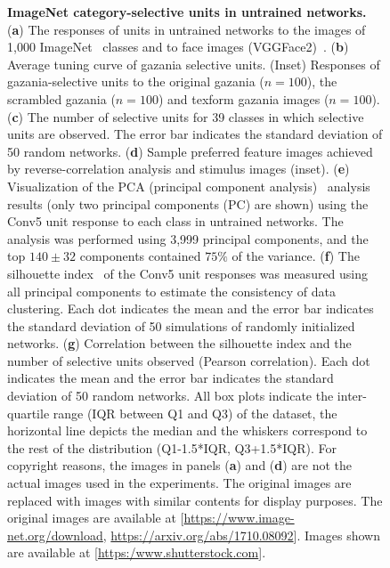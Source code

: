 \documentclass[sn-mathphys]{sn-jnl}%
\theoremstyle{thmstyleone}%
\theoremstyle{thmstyletwo}%
\theoremstyle{thmstylethree}%
\begin{document}
\begin{figure}[htbp]
	\centering
	\caption{
		\textbf{ImageNet category-selective units in untrained networks.
		}
		(\textbf{a}) The responses of units in untrained networks to the images of 1,000 ImageNet~\cite{ILSVRC15} classes and to face images (VGGFace2)~\cite{cao2018vggface2}.
		(\textbf{b}) Average tuning curve of gazania selective units.
		(Inset) Responses of gazania-selective units to the original gazania ($ n = 100 $), the scrambled gazania ($ n = 100 $) and texform gazania images ($ n = 100 $).
		(\textbf{c}) The number of selective units for 39 classes in which selective units are observed.
		The error bar indicates the standard deviation of 50 random networks.
		(\textbf{d}) Sample preferred feature images achieved by reverse-correlation analysis and stimulus images (inset).
		(\textbf{e}) Visualization of the PCA (principal component analysis)~\cite{wold1987principal} analysis results (only two principal components (PC) are shown) using the Conv5 unit response to each class in untrained networks.
		The analysis was performed using 3,999 principal components, and the top $140 \pm 32$ components contained $ 75\% $ of the variance.
		(\textbf{f}) The silhouette index~\cite{kaufman2009finding} of the Conv5 unit responses was measured using all principal components to estimate the consistency of data clustering.
		Each dot indicates the mean and the error bar indicates the standard deviation of 50 simulations of randomly initialized networks.
		(\textbf{g}) Correlation between the silhouette index and the number of selective units observed (Pearson correlation).
		Each dot indicates the mean and the error bar indicates the standard deviation of 50 random networks.
		All box plots indicate the inter-quartile range (IQR between Q1 and Q3) of the dataset, the horizontal line depicts the median and the whiskers correspond to the rest of the distribution (Q1-1.5*IQR, Q3+1.5*IQR).
		For copyright reasons, the images in panels (\textbf{a}) and (\textbf{d}) are not the actual images used in the experiments.
		The original images are replaced with images with similar contents for display purposes.
		The original images are available at [\url{https://www.image-net.org/download}, \url{https://arxiv.org/abs/1710.08092}].
		Images shown are available at [\url{https:/www.shutterstock.com}].
	}
	\label{fig:image_net}
\end{figure}
\end{document}
